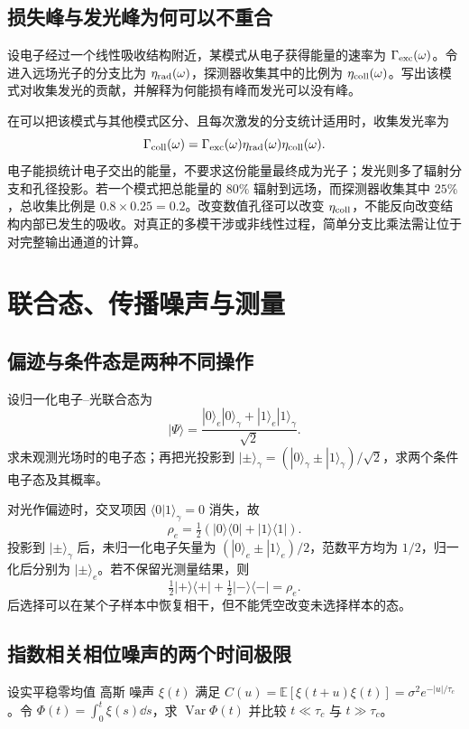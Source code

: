 \subsection*{损失峰与发光峰为何可以不重合}
设电子经过一个线性吸收结构附近，某模式从电子获得能量的速率为 \(\Gamma_{\rm exc}(\omega)\)。令进入远场光子的分支比为 \(\eta_{\rm rad}(\omega)\)，探测器收集其中的比例为 \(\eta_{\rm coll}(\omega)\)。写出该模式对收集发光的贡献，并解释为何能损有峰而发光可以没有峰。

在可以把该模式与其他模式区分、且每次激发的分支统计适用时，收集发光率为
\[
\Gamma_{\rm coll}(\omega)
=\Gamma_{\rm exc}(\omega)\eta_{\rm rad}(\omega)
\eta_{\rm coll}(\omega).
\]
电子能损统计电子交出的能量，不要求这份能量最终成为光子；发光则多了辐射分支和孔径投影。若一个模式把总能量的 \(80\%\) 辐射到远场，而探测器收集其中 \(25\%\)，总收集比例是 \(0.8\times0.25=0.2\)。改变数值孔径可以改变 \(\eta_{\rm coll}\)，不能反向改变结构内部已发生的吸收。对真正的多模干涉或非线性过程，简单分支比乘法需让位于对完整输出通道的计算。

\section{联合态、传播噪声与测量}

\subsection*{偏迹与条件态是两种不同操作}
设归一化电子--光联合态为
\[
|\Psi\rangle=\frac{|0\rangle_e|0\rangle_\gamma+
|1\rangle_e|1\rangle_\gamma}{\sqrt2}.
\]
求未观测光场时的电子态；再把光投影到 \(|\pm\rangle_\gamma=(|0\rangle_\gamma\pm|1\rangle_\gamma)/\sqrt2\)，求两个条件电子态及其概率。

对光作偏迹时，交叉项因 \(\langle0|1\rangle_\gamma=0\) 消失，故
\[
\rho_e=\tfrac12(|0\rangle\langle0|+|1\rangle\langle1|).
\]
投影到 \(|\pm\rangle_\gamma\) 后，未归一化电子矢量为
\((|0\rangle_e\pm|1\rangle_e)/2\)，范数平方均为 \(1/2\)，归一化后分别为 \(|\pm\rangle_e\)。若不保留光测量结果，则
\[
\tfrac12|+\rangle\langle+|+\tfrac12|-\rangle\langle-|
=\rho_e.
\]
后选择可以在某个子样本中恢复相干，但不能凭空改变未选择样本的态。

\subsection*{指数相关相位噪声的两个时间极限}
设实平稳零均值 高斯 噪声 \(\xi(t)\) 满足 \(C(u)=\mathbb E[\xi(t+u)\xi(t)]=\sigma^2e^{-|u|/\tau_c}\)。令 \(\Phi(t)=\int_0^t\xi(s)\dd s\)，求 \(\operatorname{Var}\Phi(t)\) 并比较 \(t\ll\tau_c\) 与 \(t\gg\tau_c\)。

